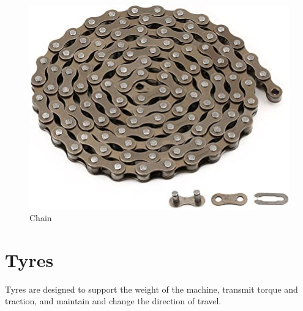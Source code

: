 \begin{figure}[H]
    \centering
    \includegraphics[scale=0.5]{chains.jpg}
    \caption{Chain}
    \label{fig:Chain}
\end{figure}

\section{Tyres} \label{Tyres}
Tyres are designed to support the weight of the machine, transmit torque and traction, and maintain and change the direction of travel. 

